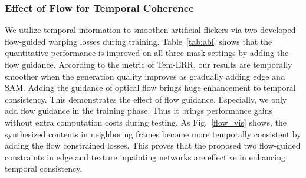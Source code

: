 \subsubsection{Effect of Flow for Temporal Coherence}

We utilize temporal information to smoothen artificial flickers via two developed flow-guided warping losses during training. 
Table~\ref{tab:abl} shows that the quantitative performance is improved on all three mask settings by adding the flow guidance. 
{\color{blue}According to the metric of Tem-ERR, our results are temporally smoother when the generation quality improves as gradually adding edge and SAM. Adding the guidance of optical flow brings huge enhancement to temporal consistency. This demonstrates the effect of flow guidance.
}
Especially, we only add flow guidance in the training phase. 
Thus it brings performance gains without extra computation costs during testing.
%
As Fig.~\ref{flow_vis} shows, the synthesized contents in neighboring frames become more temporally consistent by adding the flow constrained losses.
This proves that the proposed two flow-guided constraints in edge and texture inpainting networks are effective in enhancing temporal consistency.


